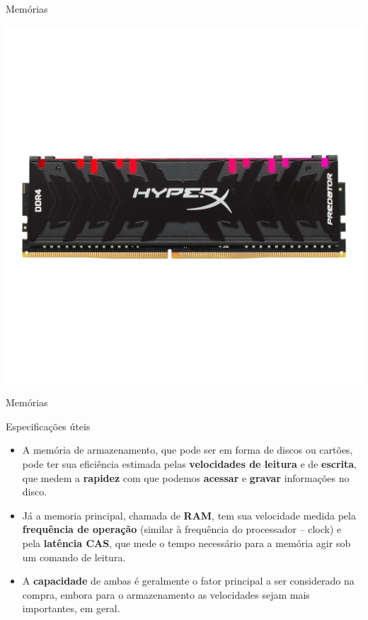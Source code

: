 \begin{frame}{Memórias}
\begin{minipage}{0.49\linewidth}
		\includegraphics[width=1\linewidth]{Figuras/Ch02/fig8.2}
	\end{minipage}
\end{frame}


\begin{frame}{Memórias}
	\begin{block}{Especificações úteis}
		\begin{itemize}
			\item A memória de armazenamento, que pode ser em forma de discos ou cartões, pode ter sua eficiência estimada pelas \textbf{velocidades de leitura} e de \textbf{escrita}, que medem a \textbf{rapidez} com que podemos \textbf{acessar} e \textbf{gravar} informações no disco.
			\item Já a memoria principal, chamada de \textbf{RAM}, tem sua velocidade medida pela \textbf{frequência de operação} (similar à frequência do processador -- clock) e pela \textbf{latência CAS}, que mede o tempo necessário para a memória agir sob um comando de leitura.
			\item A \textbf{capacidade} de ambas é geralmente o fator principal a ser considerado na compra, embora para o armazenamento as velocidades sejam mais importantes, em geral.
		\end{itemize}
	\end{block}

\end{frame}


